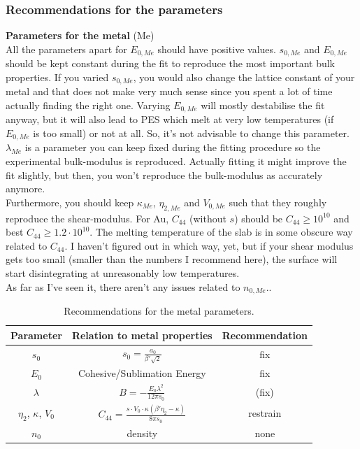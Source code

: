 \documentclass[twoside, 11pt, titlepage, captions=nooneline, a4paper, headsepline]{scrbook}%
\begin{document}
\subsubsection*{Recommendations for the parameters}
\textbf{Parameters for the metal} (Me)\\
All the parameters apart for $E_{0,Me}$ should have positive values.
$s_{0,Me}$ and $E_{0,Me}$ should be kept constant during the fit to reproduce the most important bulk properties. If you varied $s_{0,Me}$, you would also change the lattice constant of your metal and that does not make very much sense since you spent a lot of time actually finding the right one. Varying $E_{0,Me}$ will mostly destabilise the fit anyway, but it will also lead to PES which melt at very low temperatures (if $E_{0,Me}$ is too small) or not at all. So, it's not advisable to change this parameter. $\lambda_{Me}$ is a parameter you can keep fixed during the fitting procedure so the experimental bulk-modulus is reproduced. Actually fitting it might improve the fit slightly, but then, you won't reproduce the bulk-modulus as accurately anymore.\\
Furthermore, you should keep $\kappa_{Me}$, $\eta_{2,Me}$ and $V_{0,Me}$ such that they roughly reproduce the shear-modulus. For Au, $C_{44}$ (without $s$) should be $C_{44} \ge 10^{10}$ and best $C_{44} \ge 1.2 \cdot 10^{10}$. The melting temperature of the slab is in some obscure way related to $C_{44}$. I haven't figured out in which way, yet, but if your shear modulus gets too small (smaller than the numbers I recommend here), the surface will start disintegrating at unreasonably low temperatures.\\
As far as I've seen it, there aren't any issues related to $n_{0,Me}$..\\
\begin{table}[h!]
\centering
\caption{Recommendations for the metal parameters.}
\label{calsusi}
\begin{tabular}{ccc}
\hline\hline
Parameter&Relation to metal properties&Recommendation\\
\hline
$s_0$& $s_0= \frac{a_0}{\beta' \sqrt{2}}$& fix\\
$E_0$& Cohesive/Sublimation Energy& fix\\
$\lambda$&$B = -\frac{E_0 \lambda^2}{12 \pi s_0}$& (fix)\\
$\eta_2$, $\kappa$, $V_0$&$C_{44} = \frac{s\cdot V_0\cdot \kappa (\beta'\eta_2-\kappa)}{8\pi s_0}$& restrain\\
$n_0$& density& none\\
\hline\hline
\end{tabular}
\end{table}
\end{document}
